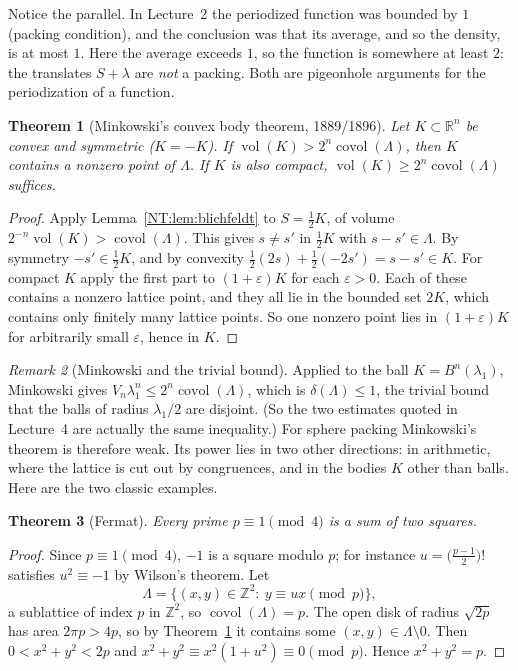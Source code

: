 \documentclass[11pt,openany]{book}
\theoremstyle{plain}
\newtheorem{theorem}{Theorem}[chapter]
\theoremstyle{definition}
\theoremstyle{remark}
\newtheorem{remark}[theorem]{Remark}
\newcommand{\R}{\mathbb{R}}
\newcommand{\Z}{\mathbb{Z}}
\newcommand{\Lat}{\Lambda}             %
\newcommand{\vol}{\operatorname{vol}}
\newcommand{\covol}{\operatorname{covol}}
\newcommand{\dens}{\delta}             %
\newcommand{\Ball}{B}                  %
\begin{document}
Notice the parallel. In Lecture~2 the periodized function was bounded by $1$ (packing condition), and
the conclusion was that its average, and so the density, is at most $1$. Here the average exceeds $1$, so
the function is somewhere at least $2$: the translates $S+\lambda$ are \emph{not} a packing. Both are
pigeonhole arguments for the periodization of a function.

\begin{theorem}[Minkowski's convex body theorem, 1889/1896]\label{NT:thm:minkowski}
Let $K\subset\R^n$ be convex and symmetric ($K=-K$). If $\vol(K)>2^n\covol(\Lat)$, then $K$ contains a
nonzero point of $\Lat$. If $K$ is also compact, $\vol(K)\ge2^n\covol(\Lat)$ suffices.
\end{theorem}

\begin{proof}
Apply Lemma~\ref{NT:lem:blichfeldt} to $S=\frac12K$, of volume $2^{-n}\vol(K)>\covol(\Lat)$. This
gives $s\ne s'$ in $\frac12K$ with $s-s'\in\Lat$. By symmetry $-s'\in\frac12K$, and by convexity
$\frac12(2s)+\frac12(-2s')=s-s'\in K$. For compact $K$ apply the first part to $(1+\varepsilon)K$ for
each $\varepsilon>0$. Each of these contains a nonzero lattice point, and they all lie in the bounded set
$2K$, which contains only finitely many lattice points. So one nonzero point lies in $(1+\varepsilon)K$
for arbitrarily small $\varepsilon$, hence in $K$.
\end{proof}

\begin{remark}[Minkowski and the trivial bound]
Applied to the ball $K=\Ball^n(\lambda_1)$, Minkowski gives $V_n\lambda_1^n\le2^n\covol(\Lat)$, which
is $\dens(\Lat)\le1$, the trivial bound that the balls of radius $\lambda_1/2$ are disjoint. (So the two
estimates quoted in Lecture~4 are actually the same inequality.) For sphere packing Minkowski's theorem
is therefore weak. Its power lies in two other directions: in arithmetic, where the lattice is
cut out by congruences, and in the bodies $K$ other than balls. Here are the two classic examples.
\end{remark}

\begin{theorem}[Fermat]\label{NT:thm:fermat}
Every prime $p\equiv1\pmod4$ is a sum of two squares.
\end{theorem}

\begin{proof}
Since $p\equiv1\pmod4$, $-1$ is a square modulo $p$; for instance $u=\big(\frac{p-1}2\big)!$ satisfies
$u^2\equiv-1$ by Wilson's theorem. Let
\[
  \Lat=\{(x,y)\in\Z^2:\ y\equiv ux\pmod p\},
\]
a sublattice of index $p$ in $\Z^2$, so $\covol(\Lat)=p$. The open disk of radius $\sqrt{2p}$ has area
$2\pi p>4p$, so by Theorem~\ref{NT:thm:minkowski} it contains some $(x,y)\in\Lat\setminus0$. Then
$0<x^2+y^2<2p$ and $x^2+y^2\equiv x^2(1+u^2)\equiv0\pmod p$. Hence $x^2+y^2=p$.
\end{proof}
\end{document}
